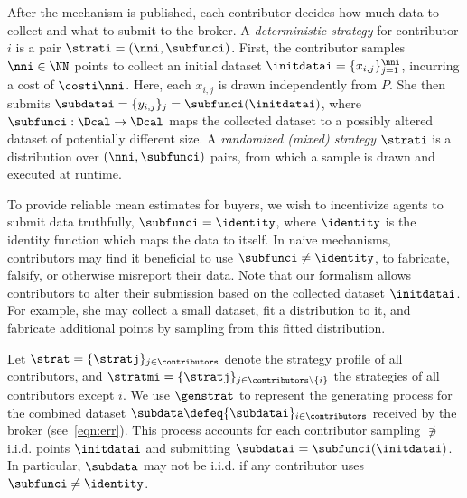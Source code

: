 After the mechanism is published, each contributor decides how much data to collect and what to submit to the broker. A \emph{deterministic strategy} for contributor $i$ is a pair $\strati = (\nni, \subfunci)$. First, the contributor samples $\nni \in \NN$ points to collect an initial dataset $\initdatai = \{x_{i,j}\}_{j=1}^{\nni}$, incurring a cost of $\costi \nni$. Here, each $x_{i,j}$ is drawn independently from $P$. She then submits $\subdatai = \{y_{i,j}\}_j = \subfunci(\initdatai)$, where $\subfunci : \Dcal \to \Dcal$ maps the collected dataset to a possibly altered dataset of potentially different size.  
A \emph{randomized (mixed) strategy} $\strati$ is a distribution over $(\nni, \subfunci)$ pairs, from which a sample is drawn and executed at runtime.



To provide reliable mean estimates for buyers, 
we wish to incentivize agents to submit data truthfully, \ie 
$\subfunci=\identity$, where $\identity$ is the identity function which maps the data to itself.
In naive mechanisms, contributors may find it beneficial to use $\subfunci\neq\identity$, to fabricate, falsify, or otherwise misreport their data.
Note that our formalism allows contributors to alter their submission based on the collected dataset $\initdatai$. For example, she may collect a small dataset, fit a distribution to it, and fabricate additional points by sampling from this fitted distribution.



Let $\strat = \{\stratj\}_{j \in \contributors}$ denote the strategy profile of all contributors, and $\stratmi = \{\stratj\}_{j \in \contributors \setminus \{i\}}$ the strategies of all contributors except $i$. We use $\genstrat$ to represent the generating process for the combined dataset $\subdata \defeq \{\subdatai\}_{i \in \contributors}$ received by the broker (see~\eqref{eqn:err}). This process accounts for each contributor sampling $\nni$ i.i.d. points $\initdatai$ and submitting $\subdatai = \subfunci(\initdatai)$.
In particular, $\subdata$ may not be i.i.d. if any contributor uses $\subfunci \neq \identity$.


